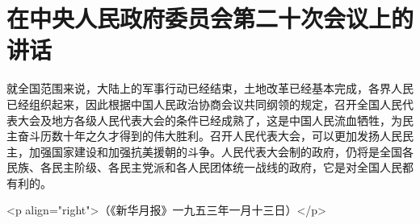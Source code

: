 \section[在中央人民政府委员会第二十次会议上的讲话（一九五三年一月十三日）]{在中央人民政府委员会第二十次会议上的讲话}


就全国范围来说，大陆上的军事行动已经结束，土地改革已经基本完成，各界人民已经组织起来，因此根据中国人民政治协商会议共同纲领的规定，召开全国人民代表大会及地方各级人民代表大会的条件已经成熟了，这是中国人民流血牺牲，为民主奋斗历数十年之久才得到的伟大胜利。召开人民代表大会，可以更加发扬人民民主，加强国家建设和加强抗美援朝的斗争。人民代表大会制的政府，仍将是全国各民族、各民主阶级、各民主党派和各人民团体统一战线的政府，它是对全国人民都有利的。

<p align="right">（《新华月报》一九五三年一月十三日）</p>


